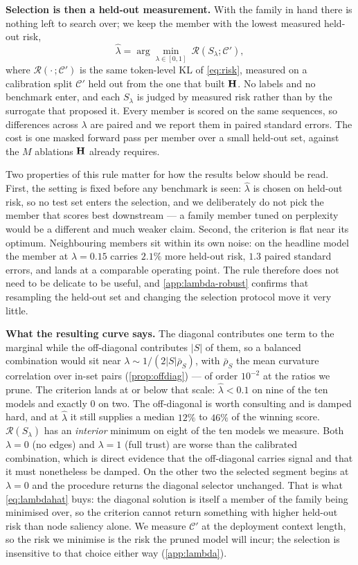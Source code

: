 \textbf{Selection is then a held-out measurement.} With the family in hand there is nothing left to
search over; we keep the member with the lowest measured held-out risk,
\begin{equation}
\hat\lambda=\arg\min_{\lambda\in[0,1]}\ \mathcal{R}(S_\lambda;\mathcal{C}'),
\label{eq:lambdahat}
\end{equation}
where $\mathcal{R}(\cdot\,;\mathcal{C}')$ is the same token-level KL of \cref{eq:risk}, measured on a
calibration split $\mathcal{C}'$ held out from the one that built $\mathbf{H}$. No labels and no benchmark enter, and each $S_\lambda$ is judged by measured risk rather than by the
surrogate that proposed it. Every member is scored on the same sequences, so differences across
$\lambda$ are paired and we report them in paired standard errors. The cost is one masked forward pass
per member over a small held-out set, against the $M$ ablations $\mathbf{H}$ already requires.

Two properties of this rule matter for how the results below should be read. First, the setting is
fixed before any benchmark is seen: $\hat\lambda$ is chosen on held-out risk, so no test set enters the
selection, and we deliberately do not pick the member that scores best downstream --- a family member
tuned on perplexity would be a different and much weaker claim. Second, the criterion is flat near its
optimum. Neighbouring members sit within its own noise: on the headline model the member at
$\lambda{=}0.15$ carries $2.1\%$ more held-out risk, $1.3$ paired standard errors, and lands at a
comparable operating point. The rule therefore does not need to be delicate to be useful, and
\cref{app:lambda-robust} confirms that resampling the held-out set and changing the selection protocol
move it very little.

\textbf{What the resulting curve says.} The diagonal contributes one term to the marginal while the
off-diagonal contributes $|S|$ of them, so a balanced combination would sit near
$\lambda\sim 1/(2|S|\bar\rho_S)$, with $\bar\rho_S$ the mean curvature correlation over in-set pairs
(\cref{prop:offdiag}) --- of order $10^{-2}$ at the ratios we prune. The criterion lands at or
below that scale: $\hat\lambda<0.1$ on nine of the ten models and exactly $0$ on two. The off-diagonal
is worth consulting and is damped hard, and at $\hat\lambda$ it still supplies a median $12\%$ to
$46\%$ of the winning score. $\mathcal{R}(S_\lambda)$ has an \emph{interior} minimum on eight of the ten models we measure. Both $\lambda\!=\!0$ (no edges) and $\lambda\!=\!1$ (full trust) are
worse than the calibrated combination, which is direct evidence that the off-diagonal carries signal
and that it must nonetheless be damped. On the other two the selected segment begins at
$\lambda\!=\!0$ and the procedure returns the diagonal selector unchanged. That is what \cref{eq:lambdahat} buys: the
diagonal solution is itself a member of the family being minimised over, so the criterion cannot
return something with higher held-out risk than node saliency alone. We measure $\mathcal{C}'$ at the deployment
context length, so the risk we minimise is the risk the pruned model will incur; the selection is
insensitive to that choice either way (\cref{app:lambda}).

